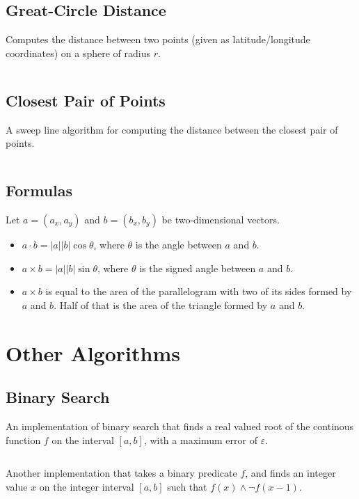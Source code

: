 \documentclass[9pt,a4paper,twocolumn,landscape,oneside]{amsart}
\newcommand{\code}[1]{\inputminted{cpp}{_code/#1}}
\begin{document}
    \subsection{Great-Circle Distance}
        Computes the distance between two points (given as latitude/longitude
        coordinates) on a sphere of radius $r$.
        \code{geometry/gc_distance.cpp}

    \subsection{Closest Pair of Points}
        A sweep line algorithm for computing the distance between the closest
        pair of points.
        \code{geometry/closest_pair.cpp}

    \subsection{Formulas}
        Let $a = (a_x, a_y)$ and $b = (b_x, b_y)$ be two-dimensional vectors.
        \begin{itemize}
            \item $a\cdot b = |a||b|\cos{\theta}$, where $\theta$ is the angle
                between $a$ and $b$.
            \item $a\times b = |a||b|\sin{\theta}$, where $\theta$ is the
                signed angle between $a$ and $b$.
            \item $a\times b$ is equal to the area of the parallelogram with
                two of its sides formed by $a$ and $b$. Half of that is the
                area of the triangle formed by $a$ and $b$.
        \end{itemize}


\section{Other Algorithms}
    \subsection{Binary Search}
        An implementation of binary search that finds a real valued root of the
        continous function $f$ on the interval $[a,b]$, with a maximum error of
        $\varepsilon$.
        \code{other/binary_search_continuous.cpp}

        Another implementation that takes a binary predicate $f$, and finds an
        integer value $x$ on the integer interval $[a,b]$ such that $f(x) \land
        \lnot f(x - 1)$.
        \code{other/binary_search_discrete.cpp}
\end{document}
